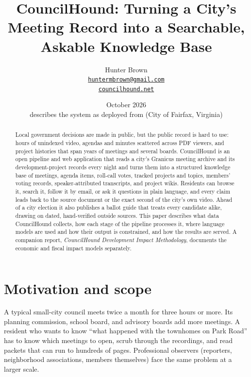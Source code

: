 \documentclass[11pt]{article}
\title{CouncilHound: Turning a City's Meeting Record into a Searchable, Askable Knowledge Base}
\author{Hunter Brown \\ \small\href{mailto:huntermbrown@gmail.com}{\texttt{huntermbrown@gmail.com}} \\ \small\href{https://councilhound.net}{\texttt{councilhound.net}}}
\date{October 2026 \\ \small describes the system as deployed from \code{main} (City of Fairfax, Virginia)}
\begin{document}
\maketitle

\begin{abstract}
\noindent
Local government decisions are made in public, but the public record is hard to use:
hours of unindexed video, agendas and minutes scattered across PDF viewers, and project
histories that span years of meetings and several boards. CouncilHound is an open
pipeline and web application that reads a city's Granicus meeting archive and its
development-project records every night and turns them into a structured knowledge base
of meetings, agenda items, roll-call votes, tracked projects and topics, members' voting
records, speaker-attributed transcripts, and project wikis. Residents can browse it,
search it, follow it by email, or ask it questions in plain language, and every claim
leads back to the source document or the exact second of the city's own video.
Ahead of a city election it also publishes a ballot guide that treats every candidate
alike, drawing on dated, hand-verified outside sources.
This paper describes what data CouncilHound collects, how each stage of the pipeline
processes it, where language models are used and how their output is constrained,
and how the results are served. A companion report,
\emph{CouncilHound Development Impact Methodology}, documents the economic and fiscal
impact models separately.
\end{abstract}

\tableofcontents
\newpage

\section{Motivation and scope}

A typical small-city council meets twice a month for three hours or more. Its planning
commission, school board, and advisory boards add more meetings. A resident who wants to
know ``what happened with the townhomes on Park Road'' has to know which meetings to
open, scrub through the recordings, and read packets that can run to hundreds of pages.
Professional observers (reporters, neighborhood associations, members themselves) face
the same problem at a larger scale.
\end{document}
